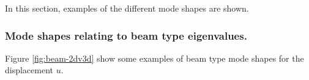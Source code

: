 \documentclass[../../main.tex]{subfiles}
\begin{document}
In this section, examples of the different mode shapes are shown. 

\subsubsection{Mode shapes relating to beam type eigenvalues.}
Figure \ref{fig:beam-2dv3d} show some examples of beam type mode shapes for the displacement $u$.

\begin{figure}[h!]
\end{figure}
\end{document}
